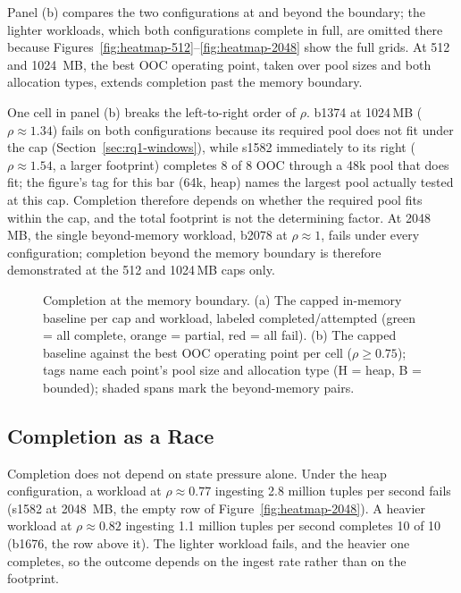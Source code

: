 Panel (b) compares the two configurations at and beyond the boundary; the lighter workloads, which both configurations complete in full, are omitted there because Figures~\ref{fig:heatmap-512}--\ref{fig:heatmap-2048} show the full grids.
At 512 and 1024\, MB, the best \ac{OOC} operating point, taken over pool sizes and both allocation types, extends completion past the memory boundary.

One cell in panel (b) breaks the left-to-right order of $\rho$.
b1374 at 1024\,MB ($\rho \approx 1.34$) fails on both configurations because its required pool does not fit under the cap (Section~\ref{sec:rq1-windows}), while s1582 immediately to its right ($\rho \approx 1.54$, a larger footprint) completes 8 of 8 \ac{OOC} through a 48k pool that does fit; the figure's tag for this bar (64k, heap) names the largest pool actually tested at this cap.
Completion therefore depends on whether the required pool fits within the cap, and the total footprint is not the determining factor.
At 2048\, MB, the single beyond-memory workload, b2078 at $\rho \approx 1$, fails under every configuration; completion beyond the memory boundary is therefore demonstrated at the 512 and 1024\,MB caps only.

\begin{figure}[htbp]
\centering
{}
\caption[Completion at the memory boundary]{Completion at the memory
boundary. (a) The capped in-memory baseline per cap and workload, labeled
completed/attempted (green = all complete, orange = partial, red = all fail).
(b) The capped baseline against the best \ac{OOC} operating point per cell
($\rho \geq 0.75$); tags name each point's pool size and allocation type
(H = heap, B = bounded); shaded spans mark the beyond-memory
pairs.\methodsnote}
\label{fig:effectiveness}
\end{figure}

\FloatBarrier
\subsection{Completion as a Race\label{sec:rq1-race}}

Completion does not depend on state pressure alone.
Under the heap configuration, a workload at $\rho \approx 0.77$ ingesting 2.8 million tuples per second fails (s1582 at 2048\, MB, the empty row of Figure~\ref{fig:heatmap-2048}).
A heavier workload at $\rho \approx 0.82$ ingesting 1.1 million tuples per second completes 10 of 10 (b1676, the row above it).
The lighter workload fails, and the heavier one completes, so the outcome depends on the ingest rate rather than on the footprint.

